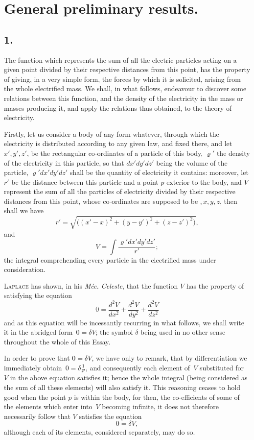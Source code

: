 \documentclass[11pt,notitlepage]{amsart}
\let\Person\textsc
\let\Title\textit
\newcommand\Section[1]{\subsection{{#1}}}
\renewcommand{\rho}{\varrho}
\begin{document}
\section{General preliminary results.}
\Section{1.}
The function which represents the sum of all the electric particles
acting on a given point divided by their respective distances from this point,
has the property of giving, in a very simple form, the forces by which it is
solicited, arising from the whole electrified mass. We shall, in what follows,
endeavour to discover some relations between this function, and the density
of the electricity in the mass or masses producing it, and apply the relations
thus obtained, to the theory of electricity.

Firstly, let us consider a body of any form whatever, through which
the electricity is distributed according to any given law, and fixed there, and
let $x',y',z'$, be the rectangular co-ordinates of a particle of this body,
$\rho'$
the density of the electricity in this particle,
so that $dx'dy'dz'$ being the volume of the particle,
$\rho'dx'dy'dz'$ shall be the quantity of electricity it contains:
moreover, let $r'$ be the distance between this particle and a point $p$
exterior to the body, and $V$ represent the sum of all the particles of
electricity divided by their respective distances from this point,
whose co-ordinates are supposed to be $,x,y,z$, then shall we have
\[
r'=\sqrt{\bigl((x'-x)^2+(y-y')^2+(z-z')^2\bigr)},
\]
and
\[
V=\int\frac{\rho'dx'dy'dz'}{r'};
\]
the integral comprehending every particle in the electrified mass under 
consideration.

\Person{Laplace} has shown, in his \Title{M\'ec. Celeste},
that the function $V$ has the
property of satisfying the equation
\[
0=\frac{d^2V}{dx^2}+\frac{d^2V}{dy^2}+\frac{d^2V}{dz^2}
\]
and as this equation will be incessantly recurring in what follows, we shall
write it in the abridged form~${0=\delta V}$;
the symbol $\delta$ being used in no other
sense throughout the whole of this Essay.

In order to prove that $0=\delta V$, we have only to remark, that by
differentiation we immediately obtain~$0=\delta\frac{1}{r'}$,
and consequently each element of~$V$ substituted for~$V$
in the above equation satisfies it; hence the
whole integral (being considered as the sum of all these elements) will also
satisfy it. This reasoning ceases to hold good when the point $p$ is within
the body, for then, the co-efficients of some of the elements which enter
into~$V$ becoming infinite,
it does not therefore necessarily follow that $V$ satisfies the equation
\[
0=\delta V,
\]
although each of its elements, considered separately, may do so.
\end{document}
